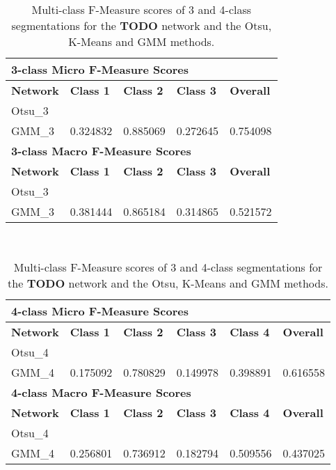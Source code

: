 \begin {table}
	\begin{flushleft}
		\begin {tabular}[!ht]{|l|l|l|l|l|}
			\hline\multicolumn{5}{|l|}{\textbf{3-class Micro F-Measure Scores}} \\ \hline
			\textbf{Network}& \textbf{Class 1}& \textbf{Class 2}& \textbf{Class 3}& \textbf{Overall} \\ \hline
			Otsu\_3& & & &  \\ \hline
			GMM\_3& 0.324832& 0.885069& 0.272645& 0.754098 \\ \hline
			\multicolumn{5}{|l|}{\textbf{3-class Macro F-Measure Scores}} \\ \hline
			\textbf{Network}& \textbf{Class 1}& \textbf{Class 2}& \textbf{Class 3}& \textbf{Overall} \\ \hline
			Otsu\_3& & & &\\ \hline
			GMM\_3& 0.381444& 0.865184& 0.314865& 0.521572 \\ \hline
		\end {tabular}
		\vspace{0.5cm}\\
		\begin {tabular}[!ht]{|l|l|l|l|l|l|}
			\hline\multicolumn{6}{|l|}{\textbf{4-class Micro F-Measure Scores}} \\ \hline
			\textbf{Network}& \textbf{Class 1}& \textbf{Class 2}& \textbf{Class 3}& \textbf{Class 4}& \textbf{Overall} \\ \hline
			Otsu\_4& & & & &  \\ \hline
			GMM\_4& 0.175092& 0.780829& 0.149978& 0.398891& 0.616558 \\ \hline
			\multicolumn{6}{|l|}{\textbf{4-class Macro F-Measure Scores}} \\ \hline
			\textbf{Network}& \textbf{Class 1}& \textbf{Class 2}& \textbf{Class 3}& \textbf{Class 4}& \textbf{Overall} \\ \hline
			Otsu\_4& & & & &  \\ \hline
			GMM\_4& 0.256801& 0.736912& 0.182794& 0.509556& 0.437025 \\ \hline
		\end {tabular}
	\end {flushleft}
\caption[Multi-class F-Measure scores for final network and other image segmentation metods.]{Multi-class F-Measure scores of 3 and 4-class segmentations for the \textbf{TODO} network and the Otsu, K-Means and GMM methods.}
\label{tab:resultsfinal}
\end {table}


